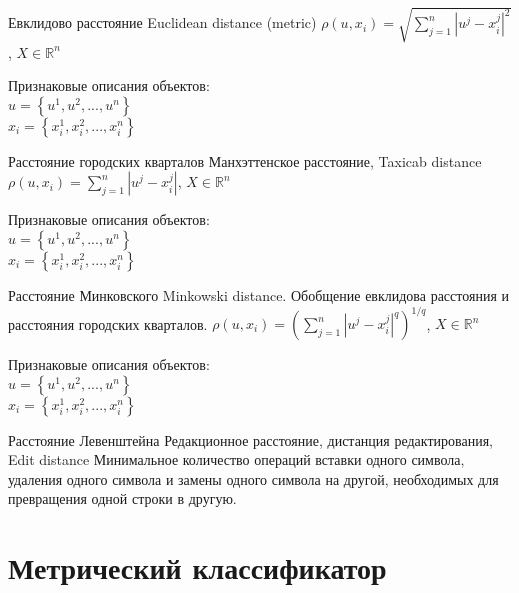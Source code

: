 \documentclass[10pt]{beamer}
\begin{document}
\begin{frame}{Евклидово расстояние}
	Euclidean distance (metric)
	\bigbreak
	${\rho (u, x_i) = \sqrt{\sum\limits_{j=1}^n |u^j - x_i^j|^2}}$, \hspace{5mm} ${X \in \mathbb{R}^{n}}$\\
	\bigbreak
	
	Признаковые описания объектов:\\
	${u = \left\{ u^1, u^2, ..., u^n \right\}}$ \\
	${x_i = \left\{x_i^1, x_i^2, ..., x_i^n \right\} }$ 
\end{frame}

\begin{frame}{Расстояние городских кварталов}
	Манхэттенское расстояние, Taxicab distance
	\bigbreak
	${\rho (u, x_i) = \sum\limits_{j=1}^n |u^j - x_i^j|}$, \hspace{5mm} ${X \in \mathbb{R}^{n}}$\\
	\bigbreak
	
	Признаковые описания объектов:\\
	${u = \left\{ u^1, u^2, ..., u^n \right\}}$ \\
	${x_i = \left\{x_i^1, x_i^2, ..., x_i^n \right\} }$ 
\end{frame}

\begin{frame}{Расстояние Минковского}
	Minkowski distance. Обобщение евклидова расстояния и расстояния городских кварталов.
	\bigbreak
	${\rho (u, x_i) = (\sum\limits_{j=1}^n |u^j - x_i^j|^q)^{1/q}}$, \hspace{5mm} ${X \in \mathbb{R}^{n}}$\\
	\bigbreak
	
	Признаковые описания объектов:\\
	${u = \left\{ u^1, u^2, ..., u^n \right\}}$ \\
	${x_i = \left\{x_i^1, x_i^2, ..., x_i^n \right\} }$ 
\end{frame}

\begin{frame}{Расстояние Левенштейна}
	Редакционное расстояние, дистанция редактирования, Edit distance 
	\bigbreak
	Минимальное количество операций вставки одного символа, удаления одного символа и замены одного символа на другой, необходимых для превращения одной строки в другую.
\end{frame}

\section{Метрический классификатор}
\end{document}
